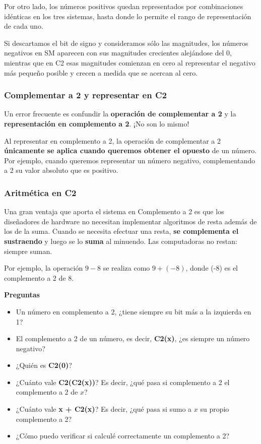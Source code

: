 \documentclass[spanish,A4,]{article}
\begin{document}
Por otro lado, los números positivos quedan representados por
combinaciones idénticas en los tres sistemas, hasta donde lo permite el
rango de representación de cada uno.

Si descartamos el bit de signo y consideramos sólo las magnitudes, los
números negativos en SM aparecen con sus magnitudes crecientes
alejándose del 0, mientras que en C2 esas magnitudes comienzan en cero
al representar el negativo más pequeño posible y crecen a medida que se
acercan al cero.

\subsubsection{Complementar a 2 y representar en
C2}\label{complementar-a-2-y-representar-en-c2}

Un error frecuente es confundir la \textbf{operación de complementar a
2} y la \textbf{representación en complemento a 2}. ¡No son lo mismo!

Al representar en complemento a 2, la operación de complementar a 2
\textbf{únicamente se aplica cuando queremos obtener el opuesto} de un
número. Por ejemplo, cuando queremos representar un número negativo,
complementando a 2 su valor absoluto que es positivo.

\subsubsection{Aritmética en C2}\label{aritmuxe9tica-en-c2}

Una gran ventaja que aporta el sistema en Complemento a 2 es que los
diseñadores de hardware no necesitan implementar algoritmos de resta
además de los de la suma. Cuando se necesita efectuar una resta,
\textbf{se complementa el sustraendo} y luego se lo \textbf{suma} al
minuendo. Las computadoras no restan: siempre suman.

Por ejemplo, la operación $9 - 8$ se realiza como $9 + (-8)$, donde (-8)
es el complemento a 2 de 8.

\textbf{Preguntas}

\begin{itemize}
\itemsep1pt\parskip0pt
\item
  Un número en complemento a 2, ¿tiene siempre su bit más a la izquierda
  en 1?
\item
  El complemento a 2 de un número, es decir, \textbf{C2(x)}, ¿es siempre
  un número negativo?
\item
  ¿Quién es \textbf{C2(0)}?
\item
  ¿Cuánto vale \textbf{C2(C2(x))}? Es decir, ¿qué pasa si complemento a
  2 el complemento a 2 de $x$?
\item
  ¿Cuánto vale \textbf{x + C2(x)}? Es decir, ¿qué pasa si sumo a $x$ su
  propio complemento a 2?
\item
  ¿Cómo puedo verificar si calculé correctamente un complemento a 2?
\end{itemize}
\end{document}
